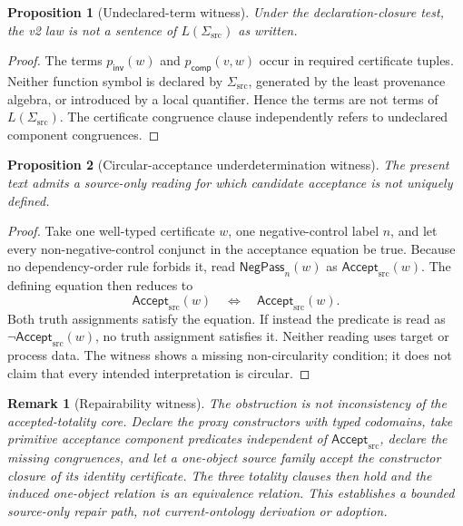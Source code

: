 \documentclass[11pt]{article}
\newtheorem{proposition}{Proposition}
\newtheorem{remark}{Remark}
\newcommand{\Accept}{\mathsf{Accept}_{\mathrm{src}}}
\begin{document}
\begin{proposition}[Undeclared-term witness]
Under the declaration-closure test, the v2 law is not a sentence of
\(L(\Sigma_{\mathrm{src}})\) as written.
\end{proposition}

\begin{proof}
The terms \(p_{\mathsf{inv}}(w)\) and
\(p_{\mathsf{comp}}(v,w)\) occur in required certificate tuples. Neither
function symbol is declared by \(\Sigma_{\mathrm{src}}\), generated by the
least provenance algebra, or introduced by a local quantifier. Hence the
terms are not terms of \(L(\Sigma_{\mathrm{src}})\). The certificate
congruence clause independently refers to undeclared component congruences.
\end{proof}

\begin{proposition}[Circular-acceptance underdetermination witness]
The present text admits a source-only reading for which candidate acceptance
is not uniquely defined.
\end{proposition}

\begin{proof}
Take one well-typed certificate \(w\), one negative-control label \(n\), and
let every non-negative-control conjunct in the acceptance equation be true.
Because no dependency-order rule forbids it, read
\(\mathsf{NegPass}_{n}(w)\) as \(\Accept(w)\). The defining equation then
reduces to
\[
 \Accept(w)\quad\Longleftrightarrow\quad\Accept(w).
\]
Both truth assignments satisfy the equation. If instead the predicate is read
as \(\neg\Accept(w)\), no truth assignment satisfies it. Neither reading uses
target or process data. The witness shows a missing non-circularity condition;
it does not claim that every intended interpretation is circular.
\end{proof}

\begin{remark}[Repairability witness]
The obstruction is not inconsistency of the accepted-totality core. Declare
the proxy constructors with typed codomains, take primitive acceptance
component predicates independent of \(\Accept\), declare the missing
congruences, and let a one-object source family accept the constructor closure
of its identity certificate. The three totality clauses then hold and the
induced one-object relation is an equivalence relation. This establishes a
bounded source-only repair path, not current-ontology derivation or adoption.
\end{remark}
\end{document}
